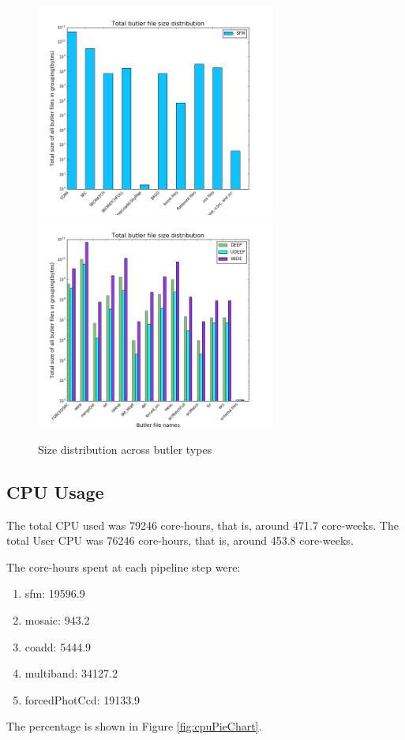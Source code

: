 \documentclass[DM,authoryear,toc]{lsstdoc}
\begin{document}
\begin{figure}[htbp]
        \begin{center}
                 \includegraphics[width=0.7\textwidth]{figures/butler_size_sfm}
                 \includegraphics[width=0.7\textwidth]{figures/butler_size_duw}
                 \caption{Size distribution across butler types}
                 \label{fig:butler_size}
        \end{center}
\end{figure}

\subsection{CPU Usage}

The total CPU used was 79246 core-hours, that is, around 471.7 core-weeks.
The total User CPU was 76246 core-hours, that is, around 453.8 core-weeks.

The core-hours spent at each pipeline step were:
\begin{enumerate}
\item
sfm: 19596.9
\item
mosaic: 943.2
\item
coadd: 5444.9
\item
multiband: 34127.2
\item
forcedPhotCcd: 19133.9
\end{enumerate}
The percentage is shown in Figure \ref{fig:cpuPieChart}.
\end{document}
